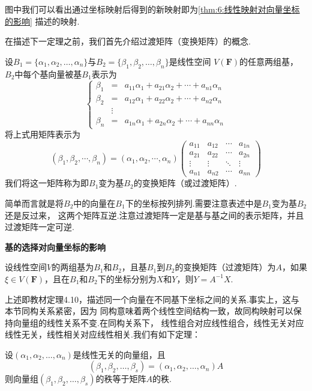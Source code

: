 图中我们可以看出通过坐标映射后得到的新映射即为\autoref{thm:6:线性映射对向量坐标的影响} 描述的映射.

在描述下一定理之前，我们首先介绍过渡矩阵（变换矩阵）的概念.
\begin{definition}
    设$B_1=\{\alpha_1,\alpha_2,\ldots,\alpha_n\}$与$B_2=\{\beta_1,\beta_2,\ldots,\beta_n\}$是线性空间
    $V(\mathbf{F})$的任意两组基，$B_2$中每个基向量被基$B_1$表示为
    \[ \left\{
    \begin{array}{rcl}
        \beta_1&=&a_{11}\alpha_1+a_{21}\alpha_2+\cdots+a_{n1}\alpha_n \\
        \beta_2&=&a_{12}\alpha_1+a_{22}\alpha_2+\cdots+a_{n2}\alpha_n \\
        &\vdots& \\
        \beta_n&=&a_{1n}\alpha_1+a_{2n}\alpha_2+\cdots+a_{nn}\alpha_n
    \end{array}
    \right. \]
    将上式用矩阵表示为
    \[(\beta_1,\beta_2,\cdots,\beta_n)=(\alpha_1,\alpha_2,\cdots,\alpha_n)\begin{pmatrix}
        a_{11} & a_{12} & \cdots & a_{1n} \\
        a_{21} & a_{22} & \cdots & a_{2n} \\
        \vdots & \vdots & \ddots & \vdots \\
        a_{n1} & a_{n2} & \cdots & a_{nn}
    \end{pmatrix}\]
    我们将这一矩阵称为即$B_1$变为基$B_2$的变换矩阵（或过渡矩阵）.
\end{definition}
简单而言就是将$B_2$中的向量在$B_1$下的坐标按列排列.需要注意表述中是$B_1$变为基$B_2$还是反过来，
这两个矩阵互逆.注意过渡矩阵一定是基与基之间的表示矩阵，并且过渡矩阵一定可逆.
\begin{theorem}
    \textbf{\heiti 基的选择对向量坐标的影响}

    设线性空间$V$的两组基为$B_1$和$B_2$，且基$B_1$到$B_2$的变换矩阵（过渡矩阵）为$A$，如果
    $\xi \in V(\mathbf{F})$，且在$B_1$和$B_2$下的坐标分别为$X$和$Y$，则$Y=A^{-1}X$.
\end{theorem}
上述即教材定理4.10，描述同一个向量在不同基下坐标之间的关系.事实上，这与本节同构关系紧密，因为
同构意味着两个线性空间结构一致，故同构映射可以保持向量组的线性关系不变.在同构关系下，
线性组合对应线性组合，线性无关对应线性无关，线性相关对应线性相关.我们有如下定理：
\begin{theorem}
    设$(\alpha_1,\alpha_2,\ldots,\alpha_n)$是线性无关的向量组，且
    \[(\beta_1,\beta_2,\ldots,\beta_s)=(\alpha_1,\alpha_2,\ldots,\alpha_n)A\]
    则向量组$(\beta_1,\beta_2,\ldots,\beta_s)$的秩等于矩阵$A$的秩.
\end{theorem}
